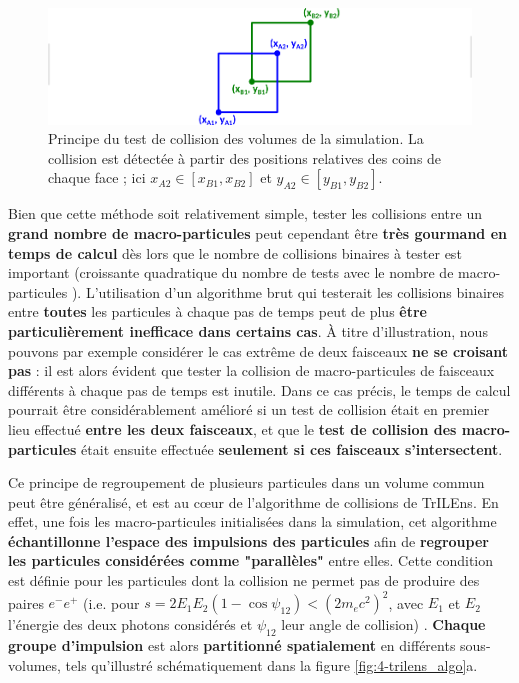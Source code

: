 \begin{refsection}
\begin{figure}[hbtp]
	\centering
	\includegraphics[width=\linewidth]{4-simulation/TrILEns_collision_detection.png}
	\caption{Principe du test de collision des volumes de la simulation. La collision est détectée à partir des positions relatives des coins de chaque face ; ici $x_{A2} \in [x_{B1},x_{B2}]$ et $y_{A2} \in [y_{B1},y_{B2}]$.}
	\label{fig:4-trilens_intersection}
\end{figure}

Bien que cette méthode soit relativement simple, tester les collisions entre un \textbf{grand nombre de macro-particules} peut cependant être \textbf{très gourmand en temps de calcul} dès lors que le nombre de collisions binaires à tester est important (croissante quadratique du nombre de tests avec le nombre de macro-particules \parencite{jansen_2018}). L'utilisation d'un algorithme brut qui testerait les collisions binaires entre \textbf{toutes} les particules à chaque pas de temps peut de plus \textbf{être particulièrement inefficace dans certains cas}.
À titre d'illustration, nous pouvons par exemple considérer le cas extrême de deux faisceaux \textbf{ne se croisant pas} : il est alors évident que tester la collision de macro-particules de faisceaux différents à chaque pas de temps est inutile. Dans ce cas précis, le temps de calcul pourrait être considérablement amélioré si un test de collision était en premier lieu effectué \textbf{entre les deux faisceaux}, et que le \textbf{test de collision des macro-particules} était ensuite effectuée \textbf{seulement si ces faisceaux s'intersectent}.

Ce principe de regroupement de plusieurs particules dans un volume commun peut être généralisé, et est au cœur de l'algorithme de collisions de TrILEns. En effet, une fois les macro-particules initialisées dans la simulation, cet algorithme \textbf{échantillonne l'espace des impulsions des particules} afin de \textbf{regrouper les particules considérées comme "parallèles"} entre elles. Cette condition est définie pour les particules dont la collision ne permet pas de produire des paires $e^-e^+$ (i.e. pour $s=2 E_1 E_2 (1-\cos\psi_{12}) < (2 m_e c^2)^2$, avec $E_1$ et $E_2$ l'énergie des deux photons considérés et $\psi_{12}$ leur angle de collision) \parencite{jansen_2018}. \textbf{Chaque groupe d'impulsion} est alors \textbf{partitionné spatialement} en différents sous-volumes, tels qu'illustré schématiquement dans la figure \ref{fig:4-trilens_algo}a.


\end{refsection}
